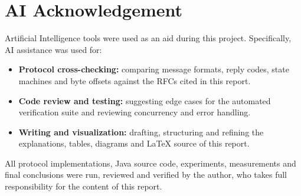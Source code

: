 \documentclass[11pt,a4paper]{article}
\begin{document}
\section*{AI Acknowledgement}
Artificial Intelligence tools were used as an aid during this project. Specifically, AI assistance was used for:
\begin{itemize}[leftmargin=2em]
    \item \textbf{Protocol cross-checking:} comparing message formats, reply codes, state machines and byte offsets against the RFCs cited in this report.
    \item \textbf{Code review and testing:} suggesting edge cases for the automated verification suite and reviewing concurrency and error handling.
    \item \textbf{Writing and visualization:} drafting, structuring and refining the explanations, tables, diagrams and \LaTeX{} source of this report.
\end{itemize}
All protocol implementations, Java source code, experiments, measurements and final conclusions were run, reviewed and verified by the author, who takes full responsibility for the content of this report.
\end{document}
